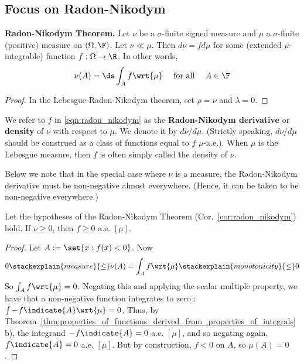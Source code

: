 \documentclass{article} %
\newcommand{\dmu}{\wrt{\mu}}
\begin{document}
\subsection{Focus on Radon-Nikodym}


\begin{corollary}{\textbf{Radon-Nikodym Theorem.}}
Let $\nu$ be a $\sigma$-finite signed measure and $\mu$ a $\sigma$-finite (positive) measure on $(\Omega, \F)$.  Let $\nu \ll \mu$. Then $d \nu = f d\mu$ for some (extended $\mu$-integrable) function $f: \Omega \to \R$. In other words,
\begin{align}
 \nu(A) = \ds\int_A f \wrt{\mu} \quad \text{ for all } \quad A \in \F 
 \label{eqn:radon_nikodym}	
\end{align}
\label{cor:radon_nikodym}
\end{corollary}

\begin{proof}
In the Lebesgue-Radon-Nikodym theorem, set $\rho=\nu$ and $\lambda=0$.	
\end{proof}


\begin{terminology}
We refer to $f$ in \eqref{eqn:radon_nikodym} as the \textbf{Radon-Nikodym derivative} or \textbf{density} of $\nu$ with respect to $\mu$.   We denote it by $d\nu/d\mu$.  (Strictly speaking, $d\nu/d\mu$ should be construed as a class of functions equal to $f$ $\mu$-a.e.). When $\mu$ is the Lebesgue measure, then $f$ is often simply called the density of $\nu$.
\end{terminology}

Below we note that in the special case where $\nu$ is a measure, the Radon-Nikodym derivative must be non-negative almost everywhere. (Hence, it can be taken to be non-negative everywhere.)
 
\begin{corollary}
Let the hypotheses of the Radon-Nikodym Theorem (Cor.~\ref{cor:radon_nikodym}) hold.  If $\nu \geq 0$, then $f \geq 0$ a.e. $[\mu]$. 
\end{corollary}

\begin{proof}
Let $A := \set{x : f(x) < 0}$.  Now 
\[ 0 \stackexplain{measure}{\leq} \nu(A) = \int_A f \dmu \stackexplain{monotonicity}{\leq} 0 \]
So $\int_A f \dmu =0$.  Negating this and applying the scalar multiple property, we have that a non-negative function integrates to zero :  $\int - f \indicate{A} \dmu =0$.  Thus, by Theorem~\ref{thm:properties_of_functions_derived_from_properties_of_integrals} b), the integrand $- f \indicate{A} =0$ a.e. $[\mu]$, and so negating again, $f \indicate{A} =0$ a.e. $[\mu]$.  But by construction, $f < 0$ on $A$, so $\mu(A)=0$.
\end{proof}
\end{document}
